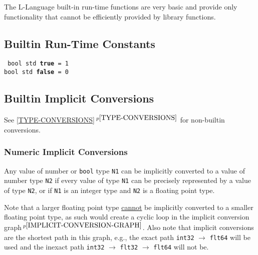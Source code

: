 \documentclass[12pt]{article}
\newcommand{\ttkey}[1]{{\tt \bfseries #1}}
\newcommand{\itemref}[1]{\ref{#1}$\,^{p\pageref{#1}}$}
\newcommand{\pagnote}[1]{$\,^{p\pageref{#1}}$}
\newenvironment{indpar}[1][0.3in]%
	{\begin{list}{}%
		     {\setlength{\itemsep}{0in}%
		      \setlength{\topsep}{0in}%
		      \setlength{\parsep}{1ex}%
		      \setlength{\labelwidth}{#1}%
		      \setlength{\leftmargin}{#1}%
		      \addtolength{\leftmargin}{\labelsep}}%
	 \item}%
	{\end{list}}
\begin{document}
The L-Language built-in run-time functions are very basic
and provide only functionality that cannot be efficiently
provided by library functions.

\subsection{Builtin Run-Time Constants}
\label{BUILTIN-RUN-TIME-CONSTANTS}

\begin{indpar} \tt
bool std \ttkey{true} = 1 \\
bool std \ttkey{false} = 0
\end{indpar}


\subsection{Builtin Implicit Conversions}
\label{BUILTIN-IMPLICIT-CONVERSIONS}

See \itemref{TYPE-CONVERSIONS} for non-builtin conversions.


\subsubsection{Numeric Implicit Conversions}
\label{NUMERIC-IMPLICIT-CONVERSIONS}

Any value of number or {\tt bool} type {\tt N1}
can be implicitly converted to a value
of number type {\tt N2} if every value of type {\tt N1} can be
precisely represented by a value of type {\tt N2}, or if {\tt N1} is
an integer type and {\tt N2}
is a floating point type.

Note that a larger floating point type
\underline{cannot} be implicitly converted to a smaller floating point type,
as such would create a cyclic loop in the
implicit conversion graph\pagnote{IMPLICIT-CONVERSION-GRAPH}.
Also note that implicit conversions are the shortest path in this
graph, e.g., the exact path {\tt int32} $\rightarrow$ {\tt flt64}
will be used and the inexact path
{\tt int32} $\rightarrow$ {\tt flt32} $\rightarrow$ {\tt flt64} will not be.
\end{document}
